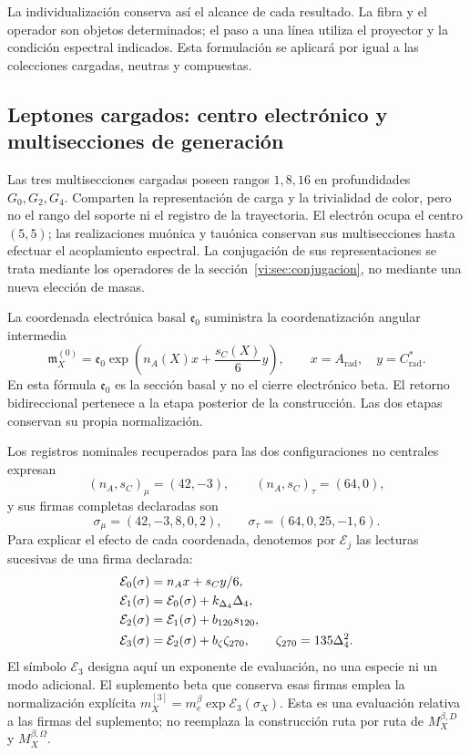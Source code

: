 La individualización conserva así el alcance de cada resultado. La fibra
y el operador son objetos determinados; el paso a una línea utiliza el
proyector y la condición espectral indicados. Esta formulación se aplicará
por igual a las colecciones cargadas, neutras y compuestas.

\subsection{Leptones cargados: centro electrónico y multisecciones de generación}
\label{vi:subsec:leptones-cargados}

Las tres multisecciones cargadas poseen rangos \(1,8,16\) en profundidades
\(G_0,G_2,G_4\). Comparten la representación de carga y la trivialidad
de color, pero no el rango del soporte ni el registro de la trayectoria.
El electrón ocupa el centro \((5,5)\); las realizaciones muónica y
tauónica conservan sus multisecciones hasta efectuar el acoplamiento
espectral. La conjugación de sus representaciones se trata mediante los
operadores de la sección~\ref{vi:sec:conjugacion}, no mediante una nueva
elección de masas.

La coordenada electrónica basal \(\mathfrak e_0\) suministra la coordenatización
angular intermedia
\begin{equation}
 \mathfrak m_X^{(0)}=\mathfrak e_0
 \exp\left(n_A(X)x+\frac{s_C(X)}6y\right),
 \qquad x=A_{\mathrm{rad}},\quad y=C^*_{\mathrm{rad}}.
 \label{vi:eq:carta-angular-familias}
\end{equation}
En esta fórmula \(\mathfrak e_0\) es la sección basal y no el cierre
electrónico beta. El retorno bidireccional pertenece a la etapa posterior
de la construcción. Las dos etapas conservan su propia normalización.

Los registros nominales recuperados para las dos configuraciones no centrales
expresan
\[
 (n_A,s_C)_\mu=(42,-3),\qquad (n_A,s_C)_\tau=(64,0),
\]
y sus firmas completas declaradas son
\begin{equation}
 \sigma_\mu=(42,-3,8,0,2),\qquad
 \sigma_\tau=(64,0,25,-1,6).
 \label{vi:eq:firmas-muon-tau}
\end{equation}
Para explicar el efecto de cada coordenada, denotemos por \(\mathcal E_j\)
las lecturas sucesivas de una firma declarada:
\begin{align}
 \mathcal E_0(\sigma)&=n_Ax+s_Cy/6,\notag\\
 \mathcal E_1(\sigma)&=\mathcal E_0(\sigma)+k_{\Delta_4}\Delta_4,\notag\\
 \mathcal E_2(\sigma)&=\mathcal E_1(\sigma)+b_{120}s_{120},\notag\\
 \mathcal E_3(\sigma)&=\mathcal E_2(\sigma)+b_\zeta\zeta_{270},
 \qquad\zeta_{270}=135\Delta_4^2.
 \label{vi:eq:etapas-e3-sectoriales}
\end{align}
El símbolo \(\mathcal E_3\) designa aquí un exponente de evaluación,
no una especie ni un modo adicional. El suplemento beta que conserva esas
firmas emplea la normalización explícita
\(m_X^{[3]}=m_e^\beta\exp\mathcal E_3(\sigma_X)\).
Esta es una evaluación relativa a las firmas del suplemento; no reemplaza
la construcción ruta por ruta de \(M_X^{\beta,D}\) y
\(M_X^{\beta,\Omega}\).

